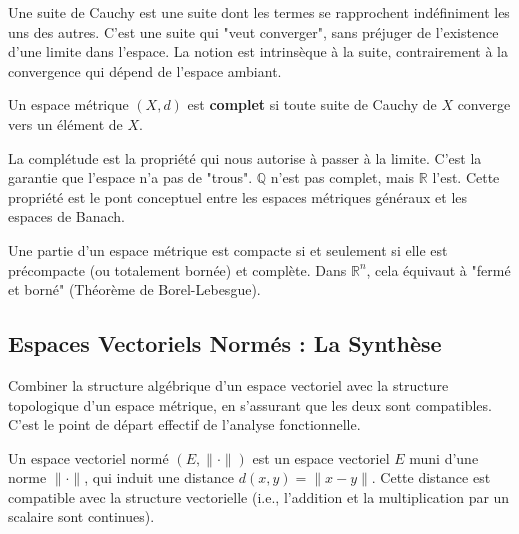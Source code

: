 \begin{remark}
    Une suite de Cauchy est une suite dont les termes se rapprochent indéfiniment les uns des autres. C'est une suite qui "veut converger", sans préjuger de l'existence d'une limite dans l'espace. La notion est intrinsèque à la suite, contrairement à la convergence qui dépend de l'espace ambiant.
\end{remark}

\begin{definition}
    Un espace métrique $(X,d)$ est \textbf{complet} si toute suite de Cauchy de $X$ converge vers un élément de $X$.
\end{definition}

\begin{remark}
    La complétude est la propriété qui nous autorise à passer à la limite. C'est la garantie que l'espace n'a pas de "trous". $\mathbb{Q}$ n'est pas complet, mais $\mathbb{R}$ l'est. Cette propriété est le pont conceptuel entre les espaces métriques généraux et les espaces de Banach.
\end{remark}

\begin{theorem}
    Une partie d'un espace métrique est compacte si et seulement si elle est précompacte (ou totalement bornée) et complète. Dans $\mathbb{R}^n$, cela équivaut à "fermé et borné" (Théorème de Borel-Lebesgue).
\end{theorem}

\subsection{Espaces Vectoriels Normés : La Synthèse}

\begin{objectif}
    Combiner la structure algébrique d'un espace vectoriel avec la structure topologique d'un espace métrique, en s'assurant que les deux sont compatibles. C'est le point de départ effectif de l'analyse fonctionnelle.
\end{objectif}

\begin{definition}
    Un espace vectoriel normé $(E, \|\cdot\|)$ est un espace vectoriel $E$ muni d'une norme $\|\cdot\|$, qui induit une distance $d(x,y) = \|x-y\|$. Cette distance est compatible avec la structure vectorielle (i.e., l'addition et la multiplication par un scalaire sont continues).
\end{definition}


